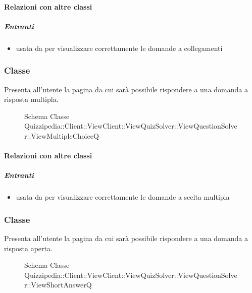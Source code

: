 \paragraph{Relazioni con altre classi}
\subparagraph{Entranti}
\begin{itemize}
\item usata da  per visualizzare correttamente le domande a collegamenti
\end{itemize}
\subsubsection{Classe }
Presenta all'utente la pagina da cui sarà possibile rispondere a una domanda a risposta multipla.
\begin{figure}[H]
\centering
\noindent{}
\caption[Schema Classe ViewMultipleChoiceQ]{Schema Classe Quizzipedia::Client::ViewClient::ViewQuizSolver::ViewQuestionSolver::ViewMultipleChoiceQ}
\end{figure}
\paragraph{Relazioni con altre classi}
\subparagraph{Entranti}
\begin{itemize}
\item usata da  per visualizzare correttamente le domande a scelta multipla
\end{itemize}
\subsubsection{Classe }
Presenta all'utente la pagina da cui sarà possibile rispondere a una domanda a risposta aperta.
\begin{figure}[H]
\centering
\noindent{}
\caption[Schema Classe ViewShortAnswerQ]{Schema Classe Quizzipedia::Client::ViewClient::ViewQuizSolver::ViewQuestionSolver::ViewShortAnswerQ}
\end{figure}
